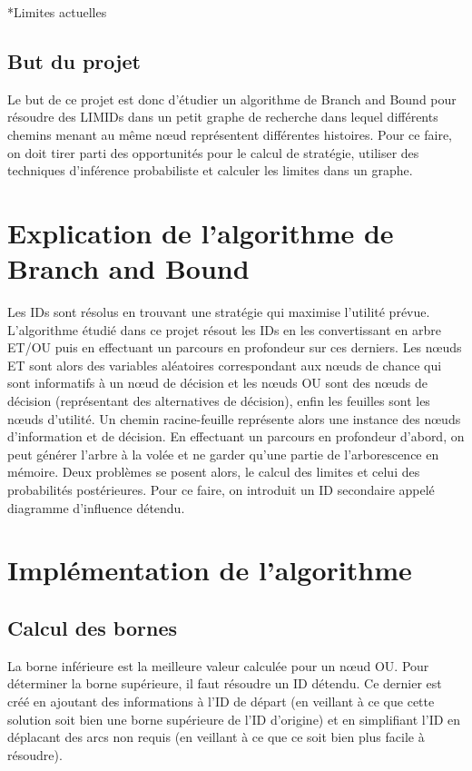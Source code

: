 \documentclass[12pt]{article}
\begin{document}
*Limites actuelles

\subsection{But du projet}
Le but de ce projet est donc d'étudier un algorithme de Branch and Bound pour résoudre des LIMIDs dans un petit graphe de recherche dans lequel différents chemins menant au même nœud représentent différentes histoires.
Pour ce faire, on doit tirer parti des opportunités pour le calcul de stratégie, utiliser des techniques d'inférence probabiliste et calculer les limites dans un graphe.

\pagebreak
\section{Explication de l'algorithme de Branch and Bound}
Les IDs sont résolus en trouvant une stratégie qui maximise l'utilité prévue.
L'algorithme étudié dans ce projet résout les IDs en les convertissant en arbre ET/OU puis en effectuant un parcours en profondeur sur ces derniers.
Les nœuds ET sont alors des variables aléatoires correspondant aux nœuds de chance qui sont informatifs à un nœud de décision et les nœuds OU sont des nœuds de décision (représentant des alternatives de décision), enfin les feuilles sont les nœuds d'utilité.
Un chemin racine-feuille représente alors une instance des nœuds d'information et de décision.
En effectuant un parcours en profondeur d'abord, on peut générer l'arbre à la volée et ne garder qu'une partie de l'arborescence en mémoire.
Deux problèmes se posent alors, le calcul des limites et celui des probabilités postérieures.
Pour ce faire, on introduit un ID secondaire appelé diagramme d'influence détendu.

\section{Implémentation de l'algorithme}

\subsection{Calcul des bornes}
La borne inférieure est la meilleure valeur calculée pour un nœud OU.
Pour déterminer la borne supérieure, il faut résoudre un ID détendu. 
Ce dernier est créé en ajoutant des informations à l'ID de départ (en veillant à ce que cette solution soit bien une borne supérieure de l'ID d'origine) et en simplifiant l'ID en déplacant des arcs non requis (en veillant à ce que ce soit bien plus facile à résoudre).
\end{document}
